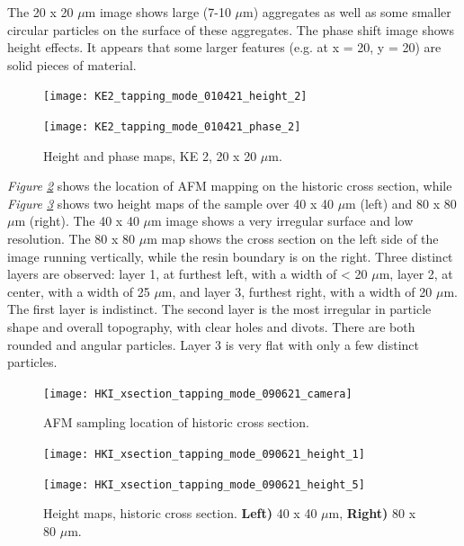 The 20 x 20 $\mu$m image shows large (7-10 $\mu$m) aggregates as well as some smaller circular particles on the surface of these aggregates. The phase shift image shows height effects. It appears that some larger features (e.g. at x = 20, y = 20) are solid pieces of material. 


\begin{figure}[H]
\centering
\begin{minipage}{.45\textwidth}
  \centering
  \texttt{[image: KE2\_tapping\_mode\_010421\_height\_2]}
\end{minipage}
\begin{minipage}{.45\textwidth}
  \centering
  \texttt{[image: KE2\_tapping\_mode\_010421\_phase\_2]}
\end{minipage}
\caption[Height and phase maps, KE 2]{Height and phase maps, KE 2, 20 x 20 $\mu$m.}
\label{fig:afm_ke2_height_phase_6}
\end{figure}



\textit{Figure \ref{fig:camera_hki_xsection}} shows the location of AFM mapping on the historic cross section, while \textit{Figure \ref{fig:afm_xsection_height_1}} shows two height maps of the sample over 40 x 40 $\mu$m (left) and 80 x 80 $\mu$m (right). The 40 x 40 $\mu$m image shows a very irregular surface and low resolution. The 80 x 80 $\mu$m map shows the cross section on the left side of the image running vertically, while the resin boundary is on the right. Three distinct layers are observed: layer 1, at furthest left, with a width of < 20 $\mu$m, layer 2, at center, with a width of 25 $\mu$m, and layer 3, furthest right, with a width of 20 $\mu$m. The first layer is indistinct. The second layer is the most irregular in particle shape and overall topography, with clear holes and divots. There are both rounded and angular particles. Layer 3 is very flat with only a few distinct particles.

\begin{figure}[H]
\centering
  \texttt{[image: HKI\_xsection\_tapping\_mode\_090621\_camera]}
\caption[AFM sampling location of historic cross section]{AFM sampling location of historic cross section.}
\label{fig:camera_hki_xsection}
\end{figure}


\begin{figure}[H]
\centering
\begin{minipage}{.45\textwidth}
  \centering
  \texttt{[image: HKI\_xsection\_tapping\_mode\_090621\_height\_1]}
\end{minipage}
\begin{minipage}{.45\textwidth}
  \centering
  \texttt{[image: HKI\_xsection\_tapping\_mode\_090621\_height\_5]}
\end{minipage}
\caption[Height maps, historic cross section]{Height maps, historic cross section. \textbf{Left)} 40 x 40 $\mu$m, \textbf{Right)} 80 x 80 $\mu$m.}
\label{fig:afm_xsection_height_1}
\end{figure}

